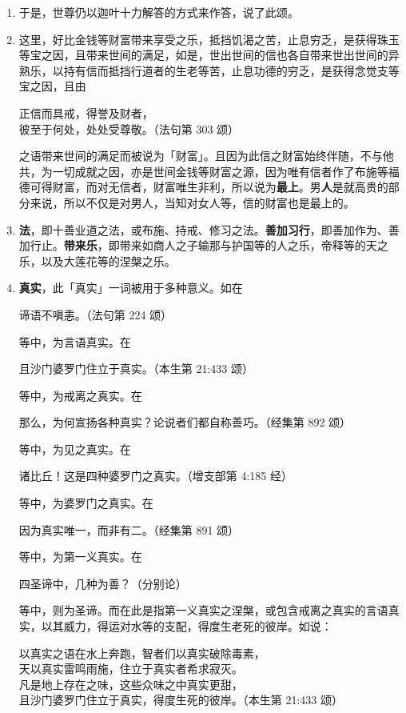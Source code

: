 \begin{enumerate}\item 于是，世尊仍以迦叶十力解答的方式来作答，说了此颂。
\item 这里，好比金钱等财富带来享受之乐，抵挡饥渴之苦，止息穷乏，是获得珠玉等宝之因，且带来世间的满足，如是，世出世间的信也各自带来世出世间的异熟乐，以持有信而抵挡行道者的生老等苦，止息功德的穷乏，是获得念觉支等宝之因，且由\begin{quoting}正信而具戒，得誉及财者，\\彼至于何处，处处受尊敬。（法句第 303 颂）\end{quoting}之语带来世间的满足而被说为「财富」。且因为此信之财富始终伴随，不与他共，为一切成就之因，亦是世间金钱等财富之源，因为唯有信者作了布施等福德可得财富，而对无信者，财富唯生非利，所以说为\textbf{最上}。男\textbf{人}是就高贵的部分来说，所以不仅是对男人，当知对女人等，信的财富也是最上的。
\item \textbf{法}，即十善业道之法，或布施、持戒、修习之法。\textbf{善加习行}，即善加作为、善加行止。\textbf{带来乐}，即带来如商人之子输那与护国等的人之乐，帝释等的天之乐，以及大莲花等的涅槃之乐。
\item \textbf{真实}，此「真实」一词被用于多种意义。如在\begin{quoting}谛语不嗔恚。（法句第 224 颂）\end{quoting}等中，为言语真实。在\begin{quoting}且沙门婆罗门住立于真实。（本生第 21:433 颂）\end{quoting}等中，为戒离之真实。在\begin{quoting}那么，为何宣扬各种真实？论说者们都自称善巧。（经集第 892 颂）\end{quoting}等中，为见之真实。在\begin{quoting}诸比丘！这是四种婆罗门之真实。（增支部第 4:185 经）\end{quoting}等中，为婆罗门之真实。在\begin{quoting}因为真实唯一，而非有二。（经集第 891 颂）\end{quoting}等中，为第一义真实。在\begin{quoting}四圣谛中，几种为善？（分别论）\end{quoting}等中，则为圣谛。而在此是指第一义真实之涅槃，或包含戒离之真实的言语真实，以其威力，得运对水等的支配，得度生老死的彼岸。如说：\begin{quoting}以真实之语在水上奔跑，智者们以真实破除毒素，\\天以真实雷鸣雨施，住立于真实者希求寂灭。\\凡是地上存在之味，这些众味之中真实更甜，\\且沙门婆罗门住立于真实，得度生死的彼岸。（本生第 21:433 颂）\end{quoting}

\end{enumerate}
